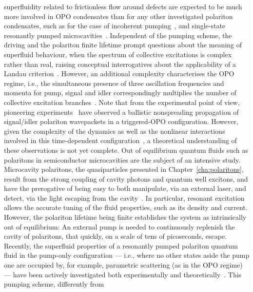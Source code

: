 superfluidity related to frictionless flow around defects are expected
to be much more involved in OPO condensates than for any other
investigated polariton condensates, such as for the case of incoherent
pumping~\cite{Kasprzak_2006,Wouters_2010}, and single-state resonantly
pumped microcavities~\cite{Amo_2009}.  Independent of the pumping
scheme, the driving and the polariton finite lifetime prompt questions
about the meaning of superfluid behaviour, when the spectrum of
collective excitations is complex rather than real, raising conceptual
interrogatives about the applicability of a Landau
criterion~\cite{Wouters_2010}.  However, an additional complexity
characterises the OPO regime, i.e., the simultaneous presence of three
oscillation frequencies and momenta for pump, signal and idler
correspondingly multiplies the number of collective excitation
branches~\cite{Wouters_2007}.  Note that from the experimental point
of view, pioneering experiments~\cite{Amo_2009_b} have observed a
ballistic nonspreading propagation of signal/idler polariton
wavepackets in a triggered-OPO configuration.  However, given the
complexity of the dynamics as well as the nonlinear interactions
involved in this time-dependent configuration~\cite{Szyma_ska_2010}, a
theoretical understanding of these observations is not yet complete.
%
Out of equilibrium quantum fluids such as polaritons in semiconductor
microcavities are the subject of an intensive study. Microcavity
polaritons, the quasiparticles presented in
Chapter~\ref{cha:polaritons}, result from the strong coupling of
cavity photons and quantum well excitons, and have the prerogative of
being easy to both manipulate, via an external laser, and detect, via
the light escaping from the cavity~\cite{9780199228942}. In
particular, resonant excitation allows the accurate tuning of the
fluid properties, such as its density and current. However, the
polariton lifetime being finite establishes the system as
intrinsically out of equilibrium: An external pump is needed to
continuously replenish the cavity of polaritons, that quickly, on a
scale of tens of picoseconds, escape.
%
Recently, the superfluid properties of a resonantly pumped polariton
quantum fluid in the pump-only configuration --- i.e., where no other
states aside the pump one are occupied by, for example, parametric
scattering (as in the OPO regime) --- have been actively investigated
both experimentally and theoretically~\cite{Carusotto_2004,
  Ciuti_2005, Amo_2009, Cancellieri_2010, Pigeon_2011, Amo_2011,
  Nardin_2011, Sanvitto_2011}. This pumping scheme, differently from
